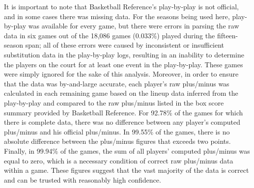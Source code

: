 It is important to note that Basketball Reference's play-by-play is not official,
and in some cases there was missing data. For the seasons being used here,
play-by-play was available for every game, but there were errors in parsing the raw
data in six games out of the 18,086 games ($0.033\%$) played during the
fifteen-season span; all of these errors were caused by inconsistent or insufficient
substitution data in the play-by-play logs, resulting in an inability to determine
the players on the court for at least one event in the play-by-play. These games
were simply ignored for the sake of this analysis. Moreover, in order to ensure that
the data was by-and-large accurate, each player's raw plus/minus was calculated in
each remaining game based on the lineup data inferred from the play-by-play and
compared to the raw plus/minus listed in the box score summary provided by
Basketball Reference. For 92.78\% of the games for which there is complete data,
there was no difference between any player's computed plus/minus and his official
plus/minus. In 99.55\% of the games, there is no absolute difference between the
plus/minus figures that exceeds two points. Finally, in 99.94\% of the games, the
sum of all players' computed plus/minus was equal to zero, which is a necessary
condition of correct raw plus/minus data within a game. These figures suggest that
the vast majority of the data is correct and can be trusted with reasonably high
confidence.



